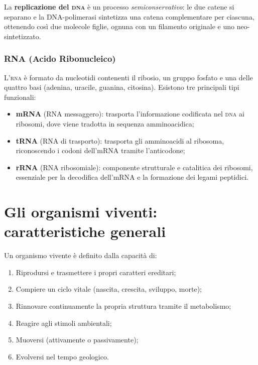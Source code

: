 \documentclass[11pt,a4paper,openright,twoside]{book}
\theoremstyle{definition}
\theoremstyle{plain}
\theoremstyle{remark}
\newcommand{\dna}{\textsc{dna}}
\newcommand{\rna}{\textsc{rna}}
\begin{document}
La \textbf{replicazione del \dna} è un processo \textit{semiconservativo}: le due catene si separano e la DNA-polimerasi sintetizza una catena complementare per ciascuna, ottenendo così due molecole figlie, ognuna con un filamento originale e uno neo-sintetizzato.

\subsubsection{RNA (Acido Ribonucleico)}

L'\rna{} è formato da nucleotidi contenenti il ribosio, un gruppo fosfato e una delle quattro basi (adenina, uracile, guanina, citosina). Esistono tre principali tipi funzionali:

\begin{itemize}
  \item \textbf{mRNA} (RNA messaggero): trasporta l'informazione codificata nel \dna{} ai ribosomi, dove viene tradotta in sequenza amminoacidica;
  \item \textbf{tRNA} (RNA di trasporto): trasporta gli amminoacidi al ribosoma, riconoscendo i codoni dell'mRNA tramite l'anticodone;
  \item \textbf{rRNA} (RNA ribosomiale): componente strutturale e catalitica dei ribosomi, essenziale per la decodifica dell'mRNA e la formazione dei legami peptidici.
\end{itemize}

\section{Gli organismi viventi: caratteristiche generali}

Un organismo vivente è definito dalla capacità di:
\begin{enumerate}
  \item Riprodursi e trasmettere i propri caratteri ereditari;
  \item Compiere un ciclo vitale (nascita, crescita, sviluppo, morte);
  \item Rinnovare continuamente la propria struttura tramite il metabolismo;
  \item Reagire agli stimoli ambientali;
  \item Muoversi (attivamente o passivamente);
  \item Evolversi nel tempo geologico.
\end{enumerate}
\end{document}
